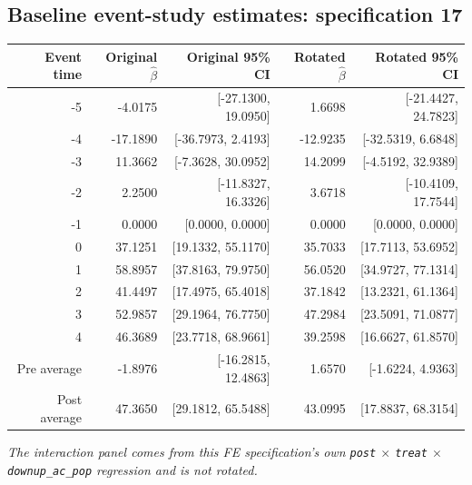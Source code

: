 \documentclass[10pt]{article}
\begin{document}
\subsection*{Baseline event-study estimates: specification 17}
\begin{center}
\scriptsize
\begin{tabular}{r rr rr}
\toprule
Event time & Original $\hat\beta$ & Original 95\% CI & Rotated $\hat\beta$ & Rotated 95\% CI \\
\midrule
-5 & -4.0175 & [-27.1300, 19.0950] & 1.6698 & [-21.4427, 24.7823] \\
-4 & -17.1890 & [-36.7973, 2.4193] & -12.9235 & [-32.5319, 6.6848] \\
-3 & 11.3662 & [-7.3628, 30.0952] & 14.2099 & [-4.5192, 32.9389] \\
-2 & 2.2500 & [-11.8327, 16.3326] & 3.6718 & [-10.4109, 17.7544] \\
-1 & 0.0000 & [0.0000, 0.0000] & 0.0000 & [0.0000, 0.0000] \\
0 & 37.1251 & [19.1332, 55.1170] & 35.7033 & [17.7113, 53.6952] \\
1 & 58.8957 & [37.8163, 79.9750] & 56.0520 & [34.9727, 77.1314] \\
2 & 41.4497 & [17.4975, 65.4018] & 37.1842 & [13.2321, 61.1364] \\
3 & 52.9857 & [29.1964, 76.7750] & 47.2984 & [23.5091, 71.0877] \\
4 & 46.3689 & [23.7718, 68.9661] & 39.2598 & [16.6627, 61.8570] \\
\midrule
Pre average & -1.8976 & [-16.2815, 12.4863] & 1.6570 & [-1.6224, 4.9363] \\
Post average & 47.3650 & [29.1812, 65.5488] & 43.0995 & [17.8837, 68.3154] \\
\bottomrule
\end{tabular}
\end{center}
\medskip
\textit{The interaction panel comes from this FE specification's own \texttt{post} $\times$ \texttt{treat} $\times$ \texttt{downup\_ac\_pop} regression and is not rotated.}
\clearpage
\end{document}

